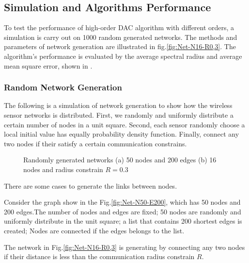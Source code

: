 \subsection{Simulation and Algorithms Performance }

To test the performance of high-order DAC algorithm with different
orders, a simulation is carry out on 1000 random generated networks.
The methods and parameters of network generation are illustrated in
fig.\ref{fig:Net-N16-R0,3}. The algorithm's performance is evaluated
by the average spectral radius and average mean square error, shown
in . 


\subsubsection{Random Network Generation}

The following is a simulation of network generation to show how the
wireless sensor networks is distributed. First, we randomly and uniformly
distribute a certain number of nodes in a unit square. Second, each
sensor randomly choose a local initial value has equally probability
density function. Finally, connect any two nodes if their satisfy
a certain communication constrains. 

\begin{figure}[h]
\hfill{}\hfill{}\hfill{}\caption{\label{fig:Random-Network}Randomly generated networks (a) 50 nodes
and 200 edges (b) 16 nodes and radius constrain $R=0.3$}
\end{figure}


There are some cases to generate the links between nodes.
\begin{caseenv}
\item Consider the graph show in the Fig.\ref{fig:Net-N50-E200}, which
has 50 nodes and 200 edges.The number of nodes and edges are fixed;
50 nodes are randomly and uniformly distribute in the unit square;
a list that contains 200 shortest edges is created; Nodes are connected
if the edges belongs to the list. 
\item The network in Fig.\ref{fig:Net-N16-R0,3} is generating by connecting
any two nodes if their distance is less than the communication radius
constrain $R$. 
\end{caseenv}

